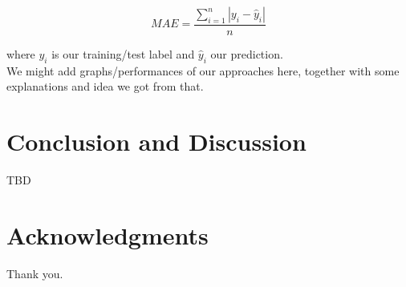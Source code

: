 \documentclass[english]{article}
\begin{document}
$$MAE = \frac{\sum_{i=1}^n |y_i - \hat{y}_i|}{n} $$

where $y_i$ is our training/test label and $\hat{y}_i$ our prediction. \\

We might add graphs/performances of our approaches here, together with some explanations and idea we got from that.

\section{Conclusion and Discussion}

TBD

\section*{Acknowledgments}

Thank you.

\newpage



\end{document}
